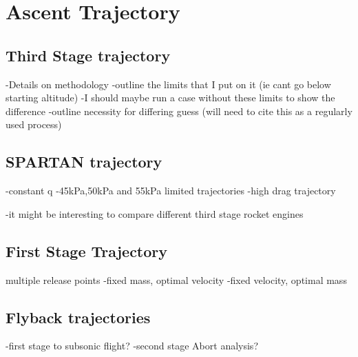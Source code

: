 
\cleardoublepage
\chapter{Ascent Trajectory}\label{chapter:numerical}




\section{Third Stage trajectory}
-Details on methodology
-outline the limits that I put on it (ie cant go below starting altitude)
-I should maybe run a case without these limits to show the difference
-outline necessity for differing guess (will need to cite this as a regularly used process)

\section{SPARTAN trajectory}
-constant q
-45kPa,50kPa and 55kPa limited trajectories
-high drag trajectory

-it might be interesting to compare different third stage rocket engines 

\section{First Stage Trajectory}
multiple release points
-fixed mass, optimal velocity
-fixed velocity, optimal mass

\section{Flyback trajectories }

-first stage to subsonic flight? 
-second stage
Abort analysis?